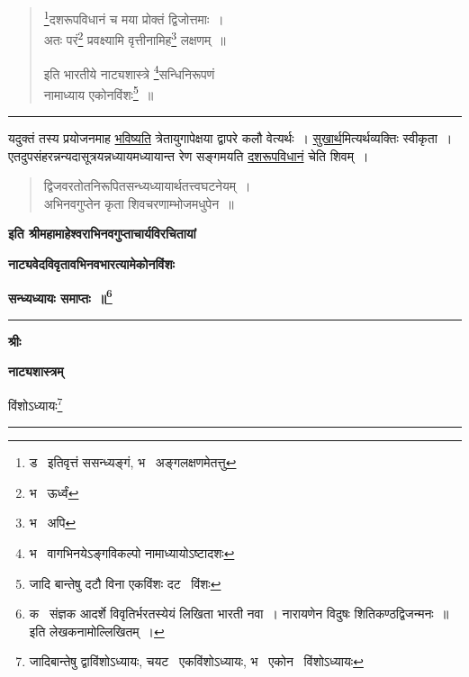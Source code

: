 \documentclass[11pt, openany]{book}
\begin{document}

\newpage
\lfoot{}

\begin{quote}
{\na \renewcommand{\thefootnote}{1}\footnote{ड \textendash\ इतिवृत्तं ससन्ध्यङ्गं, भ \textendash\ अङ्गलक्षणमेतत्तु}दशरूपविधानं च मया प्रोक्तं द्विजोत्तमाः~।\\
अतः परं\renewcommand{\thefootnote}{2}\footnote{भ \textendash\ ऊर्ध्वं} प्रवक्ष्यामि वृत्तीनामिह\renewcommand{\thefootnote}{3}\footnote{भ \textendash\ अपि} लक्षणम्~॥

इति भारतीये नाट्यशास्त्रे \renewcommand{\thefootnote}{4}\footnote{भ \textendash\ वागभिनयेऽङ्गविकल्पो नामाध्यायोऽष्टादशः}सन्धिनिरूपणं \\
नामाध्याय एकोनविंशः\renewcommand{\thefootnote}{5}\footnote{जादि बान्तेषु दटौ विना एकविंशः दट \textendash\ विंशः}~॥}
\end{quote}

\hrule

\vspace{2mm}
\noindent
यदुक्तं तस्य प्रयोजनमाह \underline{भविष्यति} त्रेतायुगापेक्षया द्वापरे कलौ वेत्यर्थः~। \underline{सुखार्थ}मित्यर्थव्यक्तिः स्वीकृता~। एतदुपसंहरन्नन्यदासूत्रयन्नध्यायमध्यायान्त रेण सङ्गमयति \underline{दशरूपविधानं} चेति शिवम्~।

\begin{quote}
{\qt द्विजवरतोतनिरूपितसन्ध्यध्यायार्थतत्त्वघटनेयम्~।\\
अभिनवगुप्तेन कृता शिवचरणाम्भोजमधुपेन~॥}
\end{quote}

\begin{center}
\textbf{इति श्रीमहामाहेश्वराभिनवगुप्ताचार्यविरचितायां}

\textbf{नाट्यवेदविवृतावभिनवभारत्यामेकोनविंशः}

\textbf{सन्ध्यध्यायः समाप्तः~॥\renewcommand{\thefootnote}{*}\footnote{क \textendash\ संज्ञक आदर्शे {\qt विवृतिर्भरतस्येयं लिखिता भारती नवा~। नारायणेन विदुषः शितिकण्ठद्विजन्मनः~॥} इति लेखकनामोल्लिखितम्~।}}

\vspace{1.5cm}
\rule{0.2\linewidth}{0.5pt}
\end{center}

\newpage
\thispagestyle{empty}
\begin{center}
\textbf{\large श्रीः}

\textbf{\LARGE नाट्यशास्त्रम्}

विंशोऽध्यायः\renewcommand{\thefootnote}{1}\footnote{जादिबान्तेषु द्वाविंशोऽध्यायः, चयट \textendash\ एकविंशोऽध्यायः, भ \textendash\ एकोन \textendash\ विंशोऽध्यायः}\\

\rule{0.2\linewidth}{0.5pt}
\end{center}
\end{document}
